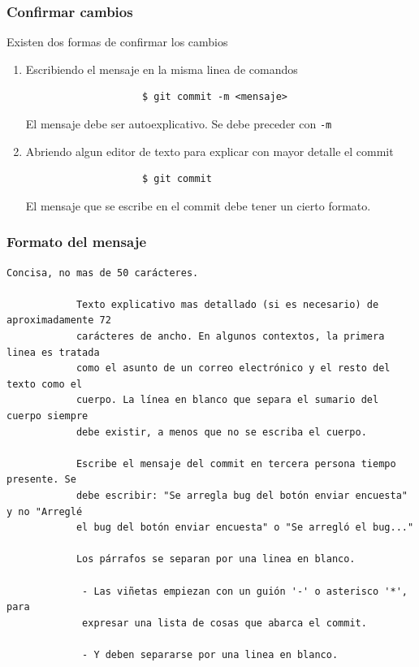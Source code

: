 \documentclass[10pt]{beamer}
\begin{document}
\begin{frame}[fragile]
	\frametitle{Confirmar cambios}
	Existen dos formas de confirmar los cambios

	\begin{enumerate}[<+(1)->]
		\item{
				Escribiendo el mensaje en la misma linea de comandos
				\begin{lstlisting}
					$ git commit -m <mensaje>
				\end{lstlisting}
				El mensaje debe ser autoexplicativo. Se debe preceder con 
				\texttt{-m}
			}
		\item{
				Abriendo algun editor de texto para explicar con mayor detalle 
				el commit
				\begin{lstlisting}
					$ git commit
				\end{lstlisting}
				El mensaje que se escribe en el commit debe tener un cierto 
				formato.
			}
	\end{enumerate}
\end{frame}

\begin{frame}[fragile]
	\frametitle{Formato del mensaje}

	\begin{center}
		\begin{Verbatim}[fontsize=\footnotesize]
			Concisa, no mas de 50 carácteres.

			Texto explicativo mas detallado (si es necesario) de aproximadamente 72 
			carácteres de ancho. En algunos contextos, la primera linea es tratada 
			como el asunto de un correo electrónico y el resto del texto como el 
			cuerpo. La línea en blanco que separa el sumario del cuerpo siempre 
			debe existir, a menos que no se escriba el cuerpo.

			Escribe el mensaje del commit en tercera persona tiempo presente. Se 
			debe escribir: "Se arregla bug del botón enviar encuesta" y no "Arreglé 
			el bug del botón enviar encuesta" o "Se arregló el bug..."

			Los párrafos se separan por una linea en blanco.

			 - Las viñetas empiezan con un guión '-' o asterisco '*', para 
			 expresar una lista de cosas que abarca el commit.

			 - Y deben separarse por una linea en blanco.
		\end{Verbatim}
	\end{center}
\end{frame}
\end{document}
